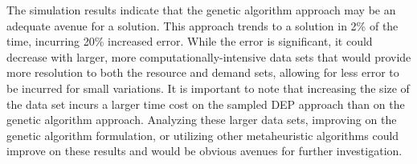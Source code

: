 \documentclass[conference]{IEEEtran}
\begin{document}
The simulation results indicate that the genetic algorithm approach may be an adequate avenue for a solution.  This approach trends to a solution in 2\% of the time, incurring 20\% increased error.  While the error is significant, it could decrease with larger, more computationally-intensive data sets that would provide more resolution to both the resource and demand sets, allowing for less error to be incurred for small variations.  It is important to note that increasing the size of the data set incurs a larger time cost on the sampled DEP approach than on the genetic algorithm approach.  Analyzing these larger data sets, improving on the genetic algorithm formulation, or utilizing other metaheuristic algorithms could improve on these results and would be obvious avenues for further investigation.














%
%
%





\end{document}
